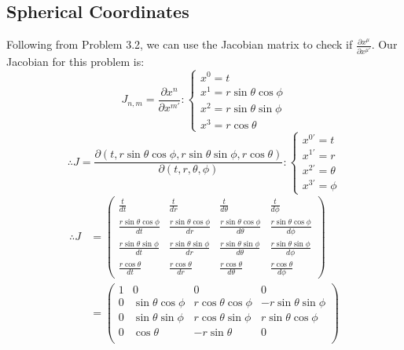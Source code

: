 \documentclass{article}
\begin{document}
	\subsection{Spherical Coordinates}
	Following from Problem 3.2, we can use the Jacobian matrix to check if $\frac{\partial x^\mu}{\partial x^{\mu '}}$. Our Jacobian for this problem is:
	\vspace{1cm}
	$$ J_{n,m} = \frac{\partial x^n}{\partial x^{m'}} : \begin{cases}
		x^0 = t\\
		x^1 = r\sin \theta \cos \phi \\
		x^2 = r \sin \theta \sin \phi \\
		x^3 = r \cos \theta
	\end{cases}$$
	$$ \therefore J = \frac{\partial \left(t, r \sin \theta \cos \phi, r \sin \theta \sin \phi, r \cos \theta \right)}{\partial (t, r, \theta, \phi)} : \begin{cases}
		x^{0'} = t \\
		x^{1'} = r \\
		x^{2'} = \theta \\
		x^{3'} = \phi
	\end{cases}$$
	\begin{align*}
		\therefore J &=
			\begin{pmatrix}
				\frac{t}{dt} 	&	\frac{t}{dr}		&	\frac{t}{d\theta}	&	\frac{t}{d\phi} \\
				\frac{r\sin \theta \cos \phi}{dt}		&	\frac{r\sin \theta \cos \phi}{dr}		&	\frac{r\sin \theta \cos \phi}{d\theta}	&	\frac{r\sin \theta \cos \phi}{d\phi} \\
				\frac{r \sin \theta \sin \phi}{dt}		&	\frac{r \sin \theta \sin \phi}{dr}		&	\frac{r \sin \theta \sin \phi}{d\theta}	&	\frac{r \sin \theta \sin \phi}{d\phi} \\
				\frac{r \cos \theta}{dt}		&	\frac{r \cos \theta}{dr}		&	\frac{r \cos \theta}{d\theta}	&	\frac{r \cos \theta}{d\phi} 
			\end{pmatrix} 
			\\&=
			\begin{pmatrix}
				1 & 0 & 0 & 0 \\
				0 & \sin \theta \cos \phi & r \cos \theta \cos \phi & -r \sin \theta \sin \phi \\
				0 & \sin \theta \sin \phi & r \cos \theta \sin \phi & r \sin \theta \cos \phi \\
				0 & \cos \theta & -r \sin \theta & 0 \\
			\end{pmatrix}
	\end{align*}
\end{document}
